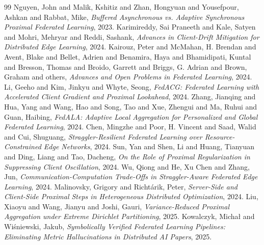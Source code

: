\documentclass[conference]{IEEEtran}
\begin{document}
\begin{thebibliography}{99}
   Nguyen, John and Malik, Kshitiz and Zhan, Hongyuan and Yousefpour, Ashkan and Rabbat, Mike, \textit{Buffered Asynchronous vs. Adaptive Synchronous Proximal Federated Learning}, 2023.
   Karimireddy, Sai Praneeth and Kale, Satyen and Mohri, Mehryar and Reddi, Sashank, \textit{Advances in Client-Drift Mitigation for Distributed Edge Learning}, 2024.
   Kairouz, Peter and McMahan, H. Brendan and Avent, Blake and Bellet, Adrien and Benamira, Haya and Bhamidipati, Kuntal and Bresson, Thomas and Broido, Garrett and Briggs, G. Adrian and Brown, Graham and others, \textit{Advances and Open Problems in Federated Learning}, 2024.
   Li, Geeho and Kim, Jinkyu and Whyte, Seong, \textit{FedACG: Federated Learning with Accelerated Client Gradient and Proximal Lookahead}, 2024.
   Zhang, Jianqing and Hua, Yang and Wang, Hao and Song, Tao and Xue, Zhengui and Ma, Ruhui and Guan, Haibing, \textit{FedALA: Adaptive Local Aggregation for Personalized and Global Federated Learning}, 2024.
   Chen, Mingzhe and Poor, H. Vincent and Saad, Walid and Cui, Shuguang, \textit{Straggler-Resilient Federated Learning over Resource-Constrained Edge Networks}, 2024.
   Sun, Yan and Shen, Li and Huang, Tianyuan and Ding, Liang and Tao, Dacheng, \textit{On the Role of Proximal Regularization in Suppressing Client Oscillation}, 2024.
   Wu, Qiong and He, Xu Chen and Zhang, Jun, \textit{Communication-Computation Trade-Offs in Straggler-Aware Federated Edge Learning}, 2024.
   Malinovsky, Grigory and Richt{\'a}rik, Peter, \textit{Server-Side and Client-Side Proximal Steps in Heterogeneous Distributed Optimization}, 2024.
   Liu, Xiaoyu and Wang, Jianyu and Joshi, Gauri, \textit{Variance-Reduced Proximal Aggregation under Extreme Dirichlet Partitioning}, 2025.
   Kowalczyk, Michał and Wiśniewski, Jakub, \textit{Symbolically Verified Federated Learning Pipelines: Eliminating Metric Hallucinations in Distributed AI Papers}, 2025.
\end{thebibliography}
\end{document}
